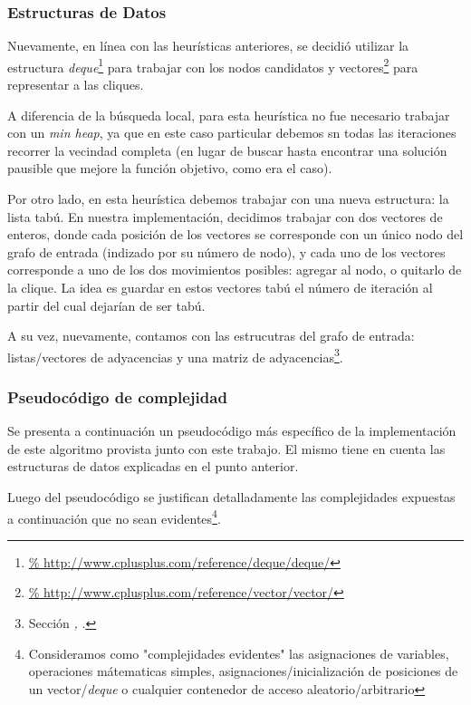 \subsubsection{Estructuras de Datos}
\par Nuevamente, en l\'inea con las heur\'isticas anteriores, se decidi\'o
    utilizar la estructura \emph{deque}\footnote{\url{%
    http://www.cplusplus.com/reference/deque/deque/}} para trabajar con
    los nodos candidatos y vectores\footnote{\url{%
    http://www.cplusplus.com/reference/vector/vector/}} para representar a
    las cliques.

\par A diferencia de la b\'usqueda local, para esta heur\'istica no fue
    necesario trabajar con un \emph{min heap}, ya que en este caso particular
    debemos sn todas las iteraciones recorrer la vecindad completa (en lugar
    de buscar hasta encontrar una soluci\'on pausible que mejore la funci\'on
    objetivo, como era el caso).

\par Por otro lado, en esta heur\'istica debemos trabajar con una nueva estructura:
    la lista tab\'u. En nuestra implementaci\'on, decidimos trabajar con dos vectores
    de enteros, donde cada posici\'on de los vectores se corresponde con un \'unico
    nodo del grafo de entrada (indizado por su n\'umero de nodo), y cada uno de
    los vectores corresponde a uno de los dos movimientos posibles: agregar al nodo,
    o quitarlo de la clique. La idea es guardar en estos vectores tab\'u el n\'umero
    de iteraci\'on al partir del cual dejar\'ian de ser tab\'u.

\par A su vez, nuevamente, contamos con las estrucutras del grafo de entrada:
    listas/vectores de adyacencias y una matriz de adyacencias\footnote{%
    Secci\'on \emph{, }.}.

\subsubsection{Pseudoc\'odigo de complejidad}
\par Se presenta a continuaci\'on un pseudoc\'odigo m\'as espec\'ifico de la implementaci\'on
    de este algoritmo provista junto con este trabajo. El mismo tiene en cuenta
    las estructuras de datos explicadas en el punto anterior.

\par Luego del pseudoc\'odigo se justifican detalladamente las complejidades
    expuestas a continuaci\'on que no sean evidentes\footnote{Consideramos
    como "complejidades evidentes" las asignaciones de variables, operaciones
    m\'atematicas simples, asignaciones/inicializaci\'on de posiciones de
    un vector/\emph{deque} o cualquier contenedor de acceso aleatorio/arbitrario}.

